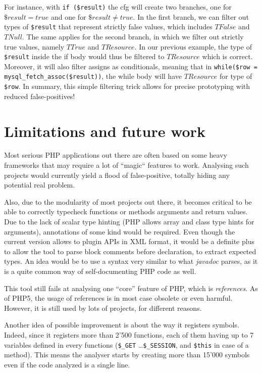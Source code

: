 \documentclass[a4paper]{article}
\begin{document}
For instance, with \verb/if ($result)/ the cfg will create two branches, one
for $\$result = true$ and one for $\$result \neq true$. In the first branch, we
can filter out types of \verb/$result/ that represent strictly false values,
which includes $TFalse$ and $TNull$. The same applies for the second branch, in
which we filter out strictly true values, namely $TTrue$ and $TResource$. In
our previous example, the type of \verb/$result/ inside the if body would thus
be filtered to $TResource$ which is correct. Moreover, it will also filter
assigns as conditionals, meaning that in 
\verb/while($row = mysql_fetch_assoc($result))/, the while body will have
$TResource$ for type of \verb/$row/. In summary, this simple filtering trick
allows for precise prototyping with reduced false-positives!

\section{Limitations and future work}
Most serious PHP applications out there are often based on some heavy frameworks
that may require a lot of ``magic`` features to work. Analysing such projects
would currently yield a flood of false-positive, totally hiding any potential
real problem.

Also, due to the modularity of most projects out there, it becomes critical to
be able to correctly typecheck functions or methods arguments and return values.
Due to the lack of scalar type hinting (PHP allows array and class type hints
for arguments), annotations of some kind would be required. Even though the
current version allows to plugin APIs in XML format, it would be a definite
plus to allow the tool to parse block comments before declaration, to extract
expected types. An idea would be to use a syntax very similar to what
\emph{javadoc} parses, as it is a quite common way of self-documenting PHP
code as well.

This tool still fails at analysing one ``core'' feature of PHP, which is
\emph{references}. As of PHP5, the usage of references is in most case obsolete
or even harmful. However, it is still used by lots of projects, for different
reasons.

Another idea of possible improvement is about the way it registers symbols.
Indeed, since it registers more than 2'500 functions, each of them having up to
7 variables defined in every functions (\verb/$_GET/ \ldots \verb/$_SESSION/,
and \verb/$this/ in case of a method). This means the analyser starts by
creating more than 15'000 symbols even if the code analyzed is a single line.
\end{document}
